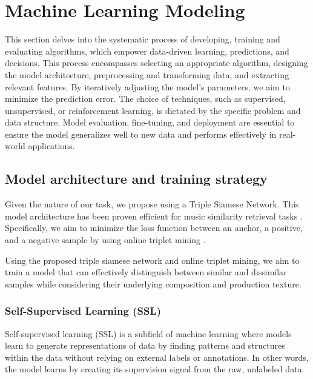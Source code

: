 \section{Machine Learning Modeling}

This section delves into the systematic process of developing, training and evaluating algorithms, which empower data-driven learning, predictions, and decisions. This process encompasses selecting an appropriate algorithm, designing the model architecture, preprocessing and transforming data, and extracting relevant features. By iteratively adjusting the model's parameters, we aim to minimize the prediction error. The choice of techniques, such as supervised, unsupervised, or reinforcement learning, is dictated by the specific problem and data structure. Model evaluation, fine-tuning, and deployment are essential to ensure the model generalizes well to new data and performs effectively in real-world applications.




\subsection{Model architecture and training strategy}

Given the nature of our task, we propose using a Triple Siamese Network. This model architecture has been proven efficient for music similarity retrieval tasks \cite{contentmusicsimtriplet2020}. Specifically, we aim to minimize the loss function between an anchor, a positive, and a negative sample by using online triplet mining \cite{Sikaroudi2020OfflinePatches}.

Using the proposed triple siamese network and online triplet mining, we aim to train a model that can effectively distinguish between similar and dissimilar samples while considering their underlying composition and production texture.

\subsubsection{Self-Supervised Learning (SSL)}

Self-supervised learning (SSL) is a subfield of machine learning where models learn to generate representations of data by finding patterns and structures within the data without relying on external labels or annotations. In other words, the model learns by creating its supervision signal from the raw, unlabeled data.\cite{audioselfsupsurvey}

